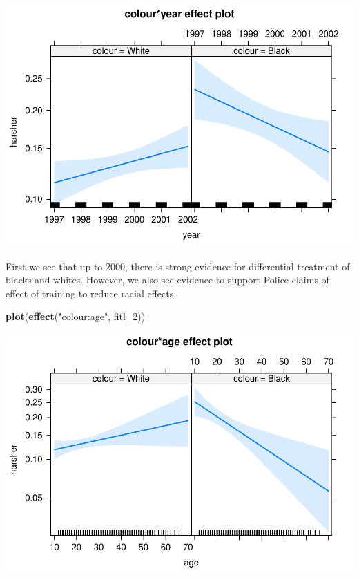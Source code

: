 \documentclass[]{book}
\newenvironment{Shaded}{\begin{snugshade}}{\end{snugshade}}
\newcommand{\DecValTok}[1]{\textcolor[rgb]{0.00,0.00,0.81}{#1}}
\newcommand{\KeywordTok}[1]{\textcolor[rgb]{0.13,0.29,0.53}{\textbf{#1}}}
\newcommand{\NormalTok}[1]{#1}
\newcommand{\StringTok}[1]{\textcolor[rgb]{0.31,0.60,0.02}{#1}}
\theoremstyle{definition}
\theoremstyle{definition}
\theoremstyle{definition}
\theoremstyle{remark}
\begin{document}
\includegraphics{09-logistic_files/figure-latex/unnamed-chunk-28-1.pdf}

First we see that up to 2000, there is strong evidence for differential
treatment of blacks and whites. However, we also see evidence to support
Police claims of effect of training to reduce racial effects.

\begin{Shaded}
\begin{Highlighting}[]
\KeywordTok{plot}\NormalTok{(}\KeywordTok{effect}\NormalTok{(}\StringTok{"colour:age"}\NormalTok{, fitl_}\DecValTok{2}\NormalTok{))}
\end{Highlighting}
\end{Shaded}

\includegraphics{09-logistic_files/figure-latex/unnamed-chunk-29-1.pdf}
\end{document}
